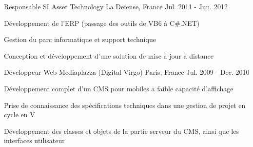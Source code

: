 \begin{cventries}
  \cventry
    {Responsable SI} %
    {Asset Technology} %
    {La Defense, France} %
    {Jul. 2011 - Jun. 2012} %
    {
      \begin{cvitems} %
        \item {Développement de l’ERP (passage des outils de VB6 à C\#.NET)}
        \item {Gestion du parc informatique et support technique}
        \item {Conception et développement d’une solution de mise à jour à distance}
      \end{cvitems}
    }

  \cventry
    {Développeur Web} %
    {Mediaplazza (Digital Virgo)} %
    {Paris, France} %
    {Jul. 2009 - Dec. 2010} %
    {
      \begin{cvitems} %
        \item {Développement complet d’un CMS pour mobiles a faible capacité d'affichage}
        \item {Prise de connaissance des spécifications techniques dans une gestion de projet en cycle en V}
        \item {Développement des classes et objets de la partie serveur du CMS, ainsi que les interfaces utilisateur}
      \end{cvitems}
    }

\end{cventries}
